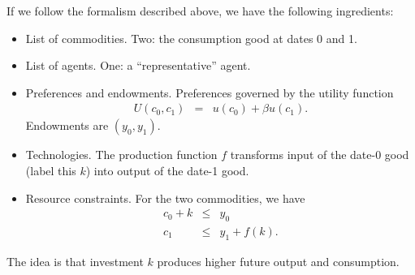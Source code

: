 \documentclass[11pt]{article}
\begin{document}
If we follow the formalism described above, we have the following ingredients:
%
\begin{itemize}
\item List of commodities.  Two:  the consumption good at dates 0 and 1.
\item List of agents.  One: a ``representative'' agent.
\item Preferences and endowments.  Preferences governed by the utility function
\begin{eqnarray*}
    U(c_0,c_1) &=& u(c_0) + \beta u(c_1) .
\end{eqnarray*}
Endowments are $(y_0,y_1)$.
\item Technologies.  The production function $f$ transforms input of the date-0 good
(label this $k$)
into output of the date-1 good.
\item Resource constraints.  For the two commodities,
we have
\begin{eqnarray*}
    c_0 + k &\leq& y_0 \\
    c_1 &\leq&  y_1 + f(k) .
\end{eqnarray*}
\end{itemize}
The idea is that investment $k$ produces higher future output and consumption.

\end{document}
